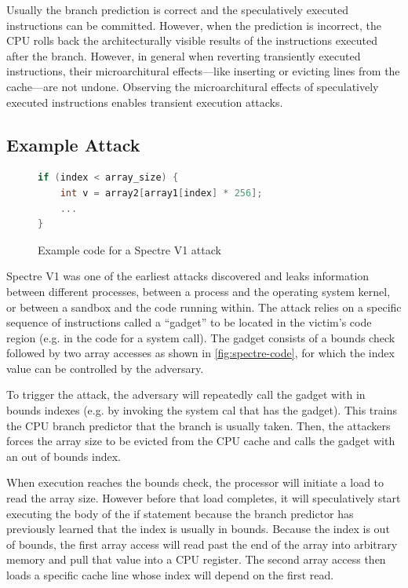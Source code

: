 Usually the branch prediction is correct and the speculatively executed instructions can be committed.
However, when the prediction is incorrect, the CPU rolls back the architecturally visible results of the instructions executed after the branch.
However, in general when reverting transiently executed instructions, their microarchitural effects---like inserting or evicting lines from the cache---are not undone.
Observing the  microarchitural effects of speculatively executed instructions enables transient execution attacks.

\subsection{Example Attack}
\begin{figure}[h]
\begin{lstlisting}[language=C, style=codeStyle]
if (index < array_size) {
    int v = array2[array1[index] * 256];
    ...
}
\end{lstlisting}
\caption{Example code for a Spectre V1 attack}
\label{fig:spectre-code}
\end{figure}
Spectre V1 was one of the earliest attacks discovered and leaks information between different processes, between a process and the operating system kernel, or between a sandbox and the code running within.
The attack relies on a specific sequence of instructions called a ``gadget'' to be located in the victim's code region (e.g. in the code for a system call).
The gadget consists of a bounds check followed by two array accesses as shown in \autoref{fig:spectre-code}, for which the index value can be controlled by the adversary.

To trigger the attack, the adversary will repeatedly call the gadget with in bounds indexes (e.g. by invoking the system cal that has the gadget).
This trains the CPU branch predictor that the branch is usually taken.
Then, the attackers forces the array size to be evicted from the CPU cache and calls the gadget with an out of bounds index.

When execution reaches the bounds check, the processor will initiate a load to read the array size.
However before that load completes, it will speculatively start executing the body of the if statement because the branch predictor has previously learned that the index is usually in bounds.
Because the index is out of bounds, the first array access will read past the end of the array into arbitrary memory and pull that value into a CPU register.
The second array access then loads a specific cache line whose index will depend on the first read.


